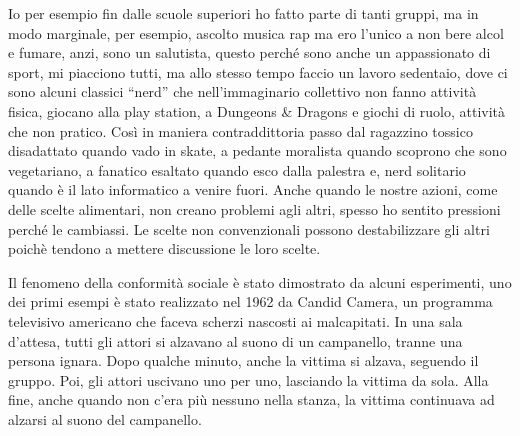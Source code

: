 \documentclass[12pt]{book} %
\begin{document}
Io per esempio fin dalle scuole superiori ho fatto parte di tanti gruppi, ma in modo marginale, per esempio,
ascolto musica rap ma ero l'unico a non bere alcol e fumare, anzi, sono un salutista,
questo perché sono anche un appassionato di sport, mi piacciono tutti, ma allo stesso tempo faccio un lavoro sedentaio, dove ci sono alcuni classici “nerd” che nell'immaginario collettivo non fanno attività fisica, giocano alla play station, a Dungeons \& Dragons e giochi di ruolo, attività che non pratico. Così in maniera contraddittoria passo dal ragazzino tossico disadattato quando
vado in skate, a pedante moralista quando scoprono che sono vegetariano, a fanatico esaltato quando esco dalla palestra
e, nerd solitario quando è il lato informatico a venire fuori.
Anche quando le nostre azioni, come delle scelte alimentari, non creano problemi agli altri, spesso ho sentito pressioni perché le cambiassi.
Le scelte non convenzionali possono destabilizzare gli altri poichè tendono a mettere discussione le loro scelte.

Il fenomeno della conformità sociale è stato dimostrato da alcuni esperimenti, uno dei primi esempi è stato realizzato nel 1962 da Candid Camera, un programma televisivo americano che faceva scherzi nascosti ai malcapitati. In una sala d'attesa, tutti gli attori si alzavano al suono di un campanello, tranne una persona ignara. Dopo qualche minuto, anche la vittima si alzava, seguendo il gruppo. Poi, gli attori uscivano uno per uno, lasciando la vittima da sola. Alla fine, anche quando non c'era più nessuno nella stanza, la vittima continuava ad alzarsi al suono del campanello.
\end{document}
